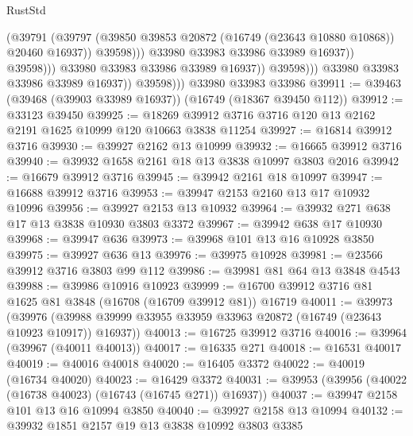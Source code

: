 \begin{lexlean}{RustStd}
\begin{coremodule}
                                      (@39791
                                        (@39797
                                          (@39850
                                            @39853
                                            @20872
                                            (@16749 (@23643 @10880 @10868))
                                            @20460
                                            @16937))
                                        @39598)))
                                  @33980
                                  @33983
                                  @33986
                                  @33989
                                  @16937))
                              @39598)))
                        @33980
                        @33983
                        @33986
                        @33989
                        @16937))
                    @39598)))
              @33980
              @33983
              @33986
              @33989
              @16937))
          @39598)))
    @33980
    @33983
    @33986
@39911 := @39463 (@39468 (@39903 @33989 @16937)) (@16749 (@18367 @39450 @112))
@39912 := @33123 @39450
@39925 := @18269 @39912 @3716 @3716 @120 @13 @2162 @2191 @1625 @10999 @120 @10663 @3838 @11254
@39927 := @16814 @39912 @3716
@39930 := @39927 @2162 @13 @10999
@39932 := @16665 @39912 @3716
@39940 := @39932 @1658 @2161 @18 @13 @3838 @10997 @3803 @2016
@39942 := @16679 @39912 @3716
@39945 := @39942 @2161 @18 @10997
@39947 := @16688 @39912 @3716
@39953 := @39947 @2153 @2160 @13 @17 @10932 @10996
@39956 := @39927 @2153 @13 @10932
@39964 := @39932 @271 @638 @17 @13 @3838 @10930 @3803 @3372
@39967 := @39942 @638 @17 @10930
@39968 := @39947 @636
@39973 := @39968 @101 @13 @16 @10928 @3850
@39975 := @39927 @636 @13
@39976 := @39975 @10928
@39981 := @23566 @39912 @3716 @3803 @99 @112
@39986 := @39981 @81 @64 @13 @3848 @4543
@39988 := @39986 @10916 @10923
@39999 := @16700 @39912 @3716 @81 @1625 @81 @3848 (@16708 (@16709 @39912 @81)) @16719
@40011 := @39973
    (@39976 (@39988 @39999 @33955 @33959 @33963 @20872 (@16749 (@23643 @10923 @10917)) @16937))
@40013 := @16725 @39912 @3716
@40016 := @39964 (@39967 (@40011 @40013))
@40017 := @16335 @271
@40018 := @16531 @40017
@40019 := @40016 @40018
@40020 := @16405 @3372
@40022 := @40019 (@16734 @40020)
@40023 := @16429 @3372
@40031 := @39953 (@39956 (@40022 (@16738 @40023) (@16743 (@16745 @271)) @16937))
@40037 := @39947 @2158 @101 @13 @16 @10994 @3850
@40040 := @39927 @2158 @13 @10994
@40132 := @39932
    @1851
    @2157
    @19
    @13
    @3838
    @10992
    @3803
    @3385

\end{coremodule}
\end{lexlean}

